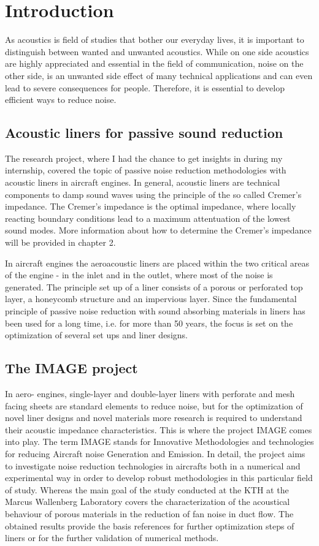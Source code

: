 \documentclass[11pt]{report} %
\begin{document}
\chapter{Introduction} 
As acoustics is field of studies that bother our everyday lives, it is important to distinguish between wanted and unwanted acoustics.
While on one side acoustics are highly appreciated and essential in the field of communication, noise on the other side, is an unwanted side effect of many technical applications and can even lead to severe consequences for people.
Therefore, it is essential to develop efficient ways to reduce noise.

\section{Acoustic liners for passive sound reduction}
The research project, where I had the chance to get insights in during my internship, covered the topic of passive noise reduction methodologies with acoustic liners in aircraft engines.
In general, acoustic liners are technical components to damp sound waves using the principle of the so called Cremer's impedance. 
The Cremer's impedance is the optimal impedance, where locally reacting boundary conditions lead to a maximum attentuation of the lowest sound modes. \cite{Abom} 
More information about how to determine the Cremer's impedance will be provided in chapter 2.   

In aircraft engines the aeroacoustic liners are placed within the two critical areas of the engine - in the inlet and in the outlet, where most of the noise is generated. 	 
The principle set up of a liner consists of a porous or perforated top layer, a honeycomb structure and an impervious layer. 
Since the fundamental principle of passive noise reduction with sound absorbing materials in liners has been used for a long time, i.e. for more than 50 years, the focus is set on the optimization of several set ups and liner designs.


\section{The IMAGE project} 
In aero- engines, single-layer and double-layer liners with perforate and mesh facing sheets are standard elements to reduce noise, but for the optimization of novel liner designs and novel materials more research is required to understand their acoustic impedance characteristics.
This is where the project IMAGE comes into play.
The term IMAGE stands for Innovative Methodologies and technologies for reducing Aircraft noise Generation and Emission.
In detail, the project aims to investigate noise reduction technologies in aircrafts both in a numerical and experimental way in order to develop robust methodologies in this particular field of study.  
Whereas the main goal of the study conducted at the KTH at the Marcus Wallenberg Laboratory covers the characterization of the acoustical behaviour of porous materials in the reduction of fan noise in duct flow. 
The obtained results provide the basis references for further optimization steps of liners or for the further validation of numerical methods. 
\end{document}
